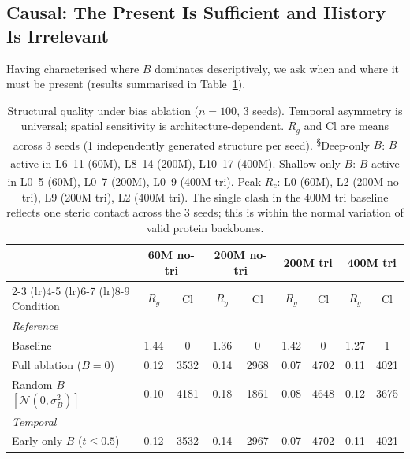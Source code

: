 \documentclass{article}
\begin{document}
\subsection{Causal: The Present Is Sufficient and History Is Irrelevant}
\label{sec:causal}

Having characterised where $B$ dominates descriptively, we ask when and where it must be present (results summarised in Table~\ref{tab:ablation}).

\begin{table}[t]
    \centering
    \footnotesize
    \setlength{\tabcolsep}{3.5pt}
    \caption{Structural quality under bias ablation ($n{=}100$, 3 seeds). Temporal asymmetry is universal; spatial sensitivity is architecture-dependent. $R_g$ and Cl are means across 3 seeds (1 independently generated structure per seed). \textsuperscript{\S}Deep-only $B$: $B$ active in L6--11 (60M), L8--14 (200M), L10--17 (400M). \textsuperscript{\textdagger}Shallow-only $B$: $B$ active in L0--5 (60M), L0--7 (200M), L0--9 (400M tri). \textsuperscript{\ddag}Peak-$R_c$: L0 (60M), L2 (200M no-tri), L9 (200M tri), L2 (400M tri). The single clash in the 400M tri baseline reflects one steric contact across the 3 seeds; this is within the normal variation of valid protein backbones.}
    \label{tab:ablation}
    \begin{tabular}{lcccccccc}
        \toprule
        & \multicolumn{2}{c}{\textbf{60M no-tri}} & \multicolumn{2}{c}{\textbf{200M no-tri}} & \multicolumn{2}{c}{\textbf{200M tri}} & \multicolumn{2}{c}{\textbf{400M tri}} \\
        \cmidrule(lr){2-3} \cmidrule(lr){4-5} \cmidrule(lr){6-7} \cmidrule(lr){8-9}
        Condition & $R_g$ & Cl & $R_g$ & Cl & $R_g$ & Cl & $R_g$ & Cl \\
        \midrule
        \multicolumn{9}{l}{\emph{Reference}} \\[2pt]
        Baseline & 1.44 & 0 & 1.36 & 0 & 1.42 & 0 & 1.27 & 1 \\
        Full ablation ($B{=}0$) & 0.12 & 3532 & 0.14 & 2968 & 0.07 & 4702 & 0.11 & 4021 \\
        Random $B$ $[\mathcal{N}(0,\sigma_B^2)]$ & 0.10 & 4181 & 0.18 & 1861 & 0.08 & 4648 & 0.12 & 3675 \\
        \midrule
        \multicolumn{9}{l}{\emph{Temporal}} \\[2pt]
        Early-only $B$ ($t{\leq}0.5$) & 0.12 & 3532 & 0.14 & 2967 & 0.07 & 4702 & 0.11 & 4021 \\

\end{tabular}
\end{table}
\end{document}

